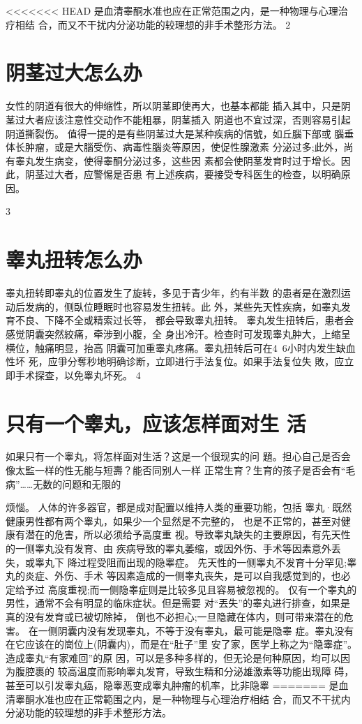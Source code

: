 \documentclass[12pt,UTF8]{ctexbook}
\begin{document}
<<<<<<< HEAD
是血清睾酮水准也应在正常范围之内，是一种物理与心理治疗相结
合，而又不干扰内分泌功能的较理想的非手术整形方法。
2
\section{阴茎过大怎么办}
女性的阴道有很大的伸缩性，所以阴茎即使再大，也基本都能
插入其中，只是阴茎过大者应该注意性交动作不能粗暴，阴茎插入
阴道也不宜过深，否则容易引起阴道撕裂伤。
值得一提的是有些阴茎过大是某种疾病的信號，如丘腦下部或
腦垂体长肿瘤，或是大腦受伤、病毒性腦炎等原因，使促性腺激素
分泌过多;此外，尚有睾丸发生病变，使得睾酮分泌过多，这些因
素都会使阴茎发育时过于增长。因此，阴茎过大者，应警惕是否患
有上述疾病，要接受专科医生的检查，以明确原因。

3
\section{睾丸扭转怎么办}
睾丸扭转即睾丸的位置发生了旋转，多见于青少年，约有半数
的患者是在激烈运动后发病的，侧臥位睡眠时也容易发生扭转。此
外，某些先天性疾病，如睾丸发育不良、下降不全或精索过长等，
都会导致睾丸扭转。
睾丸发生扭转后，患者会感觉阴囊突然絞痛，牵涉到小腹，全
身出冷汗。检查时可发现睾丸肿大，上缩呈横位，触痛明显，抬高
阴囊可加重睾丸疼痛。睾丸扭转后可在4~6小时内发生缺血性坏
死，应爭分奪秒地明确诊断，立即进行手法复位。如果手法复位失
敗，应立即手术探查，以免睾丸坏死。
4
\section{只有一个睾丸，应该怎样面对生
活}
如果只有一个睾丸，将怎样面对生活？这是一个很现实的问
題。担心自己是否会像太監一样的性无能与短壽？能否同别人一样
正常生育？生育的孩子是否会有“毛病”……无数的问题和无限的

烦惱。
人体的许多器官，都是成对配置以维持人类的重要功能，包括
睾丸·既然健康男性都有两个睾丸，如果少一个显然是不完整的，
也是不正常的，甚至对健康有潜在的危害，所以必须给予高度重
视。导致睾丸缺失的主要原因，有先天性的一侧睾丸没有发育、由
疾病导致的睾丸萎缩，或因外伤、手术等因素意外丢失，或睾丸下
降过程受阻而出现的隐睾症。
先天性的一侧睾丸不发育十分罕见;睾丸的炎症、外伤、手术
等因素造成的一侧睾丸丧失，是可以自我感觉到的，也必定给予过
高度重视;而一侧隐睾症则是比较多见且容易被忽视的。
仅有一个睾丸的男性，通常不会有明显的临床症状。但是需要
对“丟失”的睾丸进行排查，如果是真的没有发育或已被切除掉，
倒也不必担心;一旦隐藏在体内，则可带来潜在的危害。
在一侧阴囊内没有发现睾丸，不等于没有睾丸，最可能是隐睾
症。睾丸没有在它应该在的崗位上(阴囊内)，而是在“肚子”里
安了家，医学上称之为“隐睾症”。造成睾丸“有家难回”的原
因，可以是多种多样的，但无论是何种原因，均可以因为腹腔裹的
较高温度而影响睾丸发育，导致生精和分泌雄激素等功能出现障
碍，甚至可以引发睾丸癌，隐睾恶变成睾丸肿瘤的机率，比非隐睾
=======
是血清睾酮水准也应在正常範围之内，是一种物理与心理治疗相结
合，而又不干扰内分泌功能的较理想的非手术整形方法。
\end{document}
